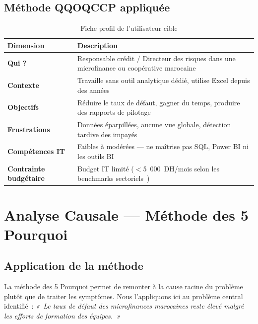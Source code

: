 \documentclass[12pt, a4paper]{report}
\begin{document}
\subsection{Méthode QQOQCCP appliquée}

\begin{table}[H]
\centering
\caption{Fiche profil de l'utilisateur cible}
\label{tab:profil_utilisateur}
\renewcommand{\arraystretch}{1.4}
\begin{tabularx}{\textwidth}{p{3.5cm} X}
\toprule
\rowcolor{primary!12}
Dimension & Description \\
\midrule
\textbf{Qui ?} & Responsable crédit / Directeur des risques dans une microfinance ou coopérative marocaine \\
\textbf{Contexte} & Travaille sans outil analytique dédié, utilise Excel depuis des années \\
\textbf{Objectifs} & Réduire le taux de défaut, gagner du temps, produire des rapports de pilotage \\
\textbf{Frustrations} & Données éparpillées, aucune vue globale, détection tardive des impayés \\
\textbf{Compétences IT} & Faibles à modérées --- ne maîtrise pas SQL, Power BI ni les outils BI \\
\textbf{Contrainte budgétaire} & Budget IT limité ($<$5~000~DH/mois selon les benchmarks sectoriels~\cite{tp3_faisabilite}) \\
\bottomrule
\end{tabularx}
\end{table}

\section{Analyse Causale --- Méthode des 5 Pourquoi}

\subsection{Application de la méthode}

La méthode des 5 Pourquoi permet de remonter à la cause racine du problème plutôt
que de traiter les symptômes. Nous l'appliquons ici au problème central identifié~:
\textit{«~Le taux de défaut des microfinances marocaines reste élevé malgré les
efforts de formation des équipes.~»}
\end{document}
